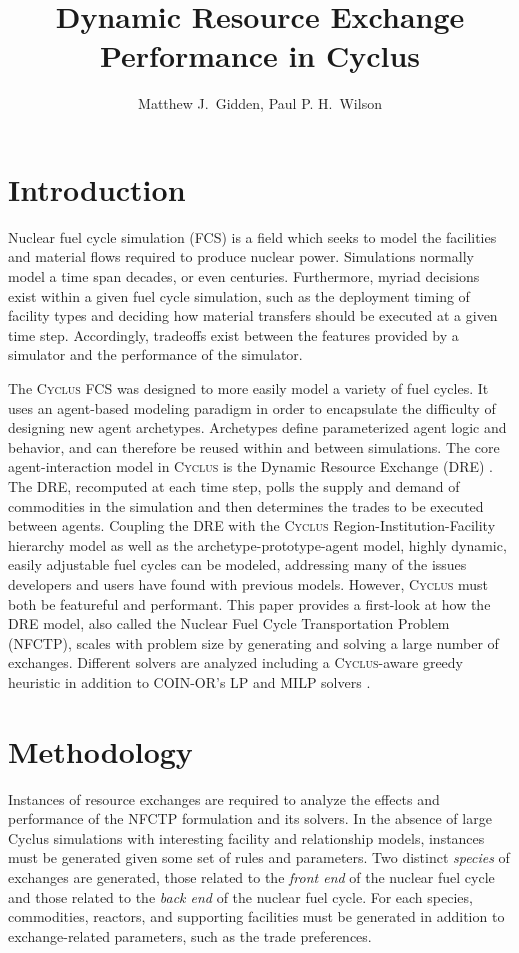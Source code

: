 \documentclass{anstrans}
\title{Dynamic Resource Exchange Performance in Cyclus}
\author{Matthew J.~Gidden, Paul P. H.~Wilson}
\institute{
University of Wisconsin, Madison WI
}
\newcommand{\Cyclus}{\textsc{Cyclus}}
\begin{document}
\section{Introduction}
Nuclear fuel cycle simulation (FCS) is a field which seeks to model the
facilities and material flows required to produce nuclear power. Simulations
normally model a time span decades, or even centuries. Furthermore, myriad
decisions exist within a given fuel cycle simulation, such as the deployment
timing of facility types and deciding how material transfers should be executed
at a given time step. Accordingly, tradeoffs exist between the features provided
by a simulator and the performance of the simulator.

The \Cyclus{} FCS \cite{cyclus2014} was designed to more easily model a variety
of fuel cycles. It uses an agent-based modeling paradigm in order to encapsulate
the difficulty of designing new agent archetypes. Archetypes define
parameterized agent logic and behavior, and can therefore be reused within and
between simulations. The core agent-interaction model in \Cyclus{} is the
Dynamic Resource Exchange (DRE) \cite{gidden_agent-based_2013,
  gidden_agent-based_2014}. The DRE, recomputed at each time step, polls the
supply and demand of commodities in the simulation and then determines the
trades to be executed between agents. Coupling the DRE with the \Cyclus{}
Region-Institution-Facility hierarchy model as well as the
archetype-prototype-agent model, highly dynamic, easily adjustable fuel cycles
can be modeled, addressing many of the issues developers and users have found
with previous models. However, \Cyclus{} must both be featureful and
performant. This paper provides a first-look at how the DRE model, also called
the Nuclear Fuel Cycle Transportation Problem (NFCTP), scales with problem size
by generating and solving a large number of exchanges. Different solvers are
analyzed including a \Cyclus{}-aware greedy heuristic in addition to COIN-OR's
LP and MILP solvers \cite{coinclp, coincbc}.

\section{Methodology}

Instances of resource exchanges are required to analyze the effects and
performance of the NFCTP formulation and its solvers. In the absence of large
Cyclus simulations with interesting facility and relationship models, instances
must be generated given some set of rules and parameters. Two distinct
\textit{species} of exchanges are generated, those related to the \textit{front
  end} of the nuclear fuel cycle and those related to the \textit{back end} of
the nuclear fuel cycle. For each species, commodities, reactors, and supporting
facilities must be generated in addition to exchange-related parameters, such as
the trade preferences.
\end{document}
